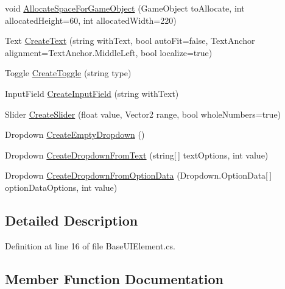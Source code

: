 \begin{DoxyCompactItemize}
void \hyperlink{class_base_u_i_element_a9c2460f69f6f206de7bbda85e9cb6062}{Allocate\+Space\+For\+Game\+Object} (Game\+Object to\+Allocate, int allocated\+Height=60, int allocated\+Width=220)
\item 
Text \hyperlink{class_base_u_i_element_ad6793a01923a012a3d0431e74e460029}{Create\+Text} (string with\+Text, bool auto\+Fit=false, Text\+Anchor alignment=Text\+Anchor.\+Middle\+Left, bool localize=true)
\item 
Toggle \hyperlink{class_base_u_i_element_a6a88fe381d2b20203669af0057669a9b}{Create\+Toggle} (string type)
\item 
Input\+Field \hyperlink{class_base_u_i_element_a66e9971975d8d24b2f59a5f67e498f44}{Create\+Input\+Field} (string with\+Text)
\item 
Slider \hyperlink{class_base_u_i_element_a79f0d812a1cb543024770f45450c6daf}{Create\+Slider} (float value, Vector2 range, bool whole\+Numbers=true)
\item 
Dropdown \hyperlink{class_base_u_i_element_a0c39035955d916aaf1f1259b5775f31d}{Create\+Empty\+Dropdown} ()
\item 
Dropdown \hyperlink{class_base_u_i_element_a639e4a3de2f62f1ab90f96f70f5b2833}{Create\+Dropdown\+From\+Text} (string\mbox{[}$\,$\mbox{]} text\+Options, int value)
\item 
Dropdown \hyperlink{class_base_u_i_element_ae171e935c4d38482a14abe560a96b556}{Create\+Dropdown\+From\+Option\+Data} (Dropdown.\+Option\+Data\mbox{[}$\,$\mbox{]} option\+Data\+Options, int value)
\end{DoxyCompactItemize}


\subsection{Detailed Description}


Definition at line 16 of file Base\+U\+I\+Element.\+cs.



\subsection{Member Function Documentation}
\mbox{\label{class_base_u_i_element_a9c2460f69f6f206de7bbda85e9cb6062}} 
